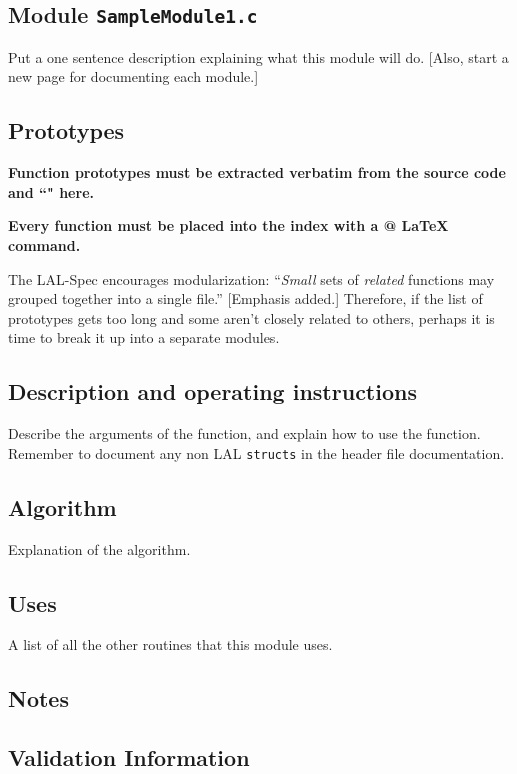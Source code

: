 \documentclass[oneside]{book}
\begin{document}
\newpage

\subsection{Module {\texttt {SampleModule1.c}}}
Put a one sentence description explaining what this module will do.
[Also, start a new page for documenting each module.]

\subsection*{Prototypes}
{\bf Function prototypes must be extracted verbatim from
the source code and ``{\verb@@}" here.}

\noindent
{\bf Every function must be placed into the index with
a \verb@{}@ {\LaTeX} command.}

The LAL-Spec encourages modularization: ``{\it Small} sets of {\it
related} functions may grouped together into a single file.''
[Emphasis added.] Therefore, if the list of prototypes gets too long
and some aren't closely related to others, perhaps it is time to break
it up into a separate modules.

\subsection*{Description and operating instructions}
Describe the arguments of the function, and explain how to use the function.
Remember to document any non LAL {\tt structs} in the header
file documentation.

\subsection*{Algorithm}
Explanation of the algorithm.

\subsection*{Uses}
A list of all the other routines that this module uses.

\subsection*{Notes}

\subsection*{Validation Information}
\end{document}
